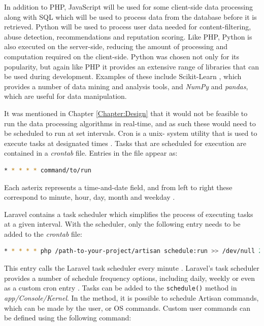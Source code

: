 In addition to PHP, JavaScript will be used for some client-side data processing along with SQL which will be used to process data from the database before it is retrieved. Python will be used to process user data needed for content-filtering, abuse detection, recommendations and reputation scoring. Like PHP, Python is also executed on the server-side, reducing the amount of processing and computation required on the client-side. Python was chosen not only for its popularity, but again like PHP it provides an extensive range of libraries that can be used during development. Examples of these include Scikit-Learn \cite{scikit:home}, which provides a number of data mining and analysis tools, and \emph{NumPy} and \emph{pandas}, which are useful for data manipulation.

It was mentioned in Chapter \ref{Chapter:Design} that it would not be feasible to run the data processing algorithms in real-time, and as such these would need to be scheduled to run at set intervals. Cron is a unix- system utility that is used to execute tasks at designated times \cite{Ubuntu:Cron}. Tasks that are scheduled for execution are contained in a \textit{crontab} file. Entries in the file appear as:
\begin{lstlisting}[language=bash]
* * * * * command/to/run
\end{lstlisting}

\noindent Each asterix represents a time-and-date field, and from left to right these correspond to minute, hour, day, month and weekday \cite{Ubuntu:Cron}. 

Laravel contains a task scheduler which simplifies the process of executing tasks at a given interval. With the scheduler, only the following entry needs to be added to the \textit{crontab} file:

\begin{lstlisting}[language=bash]
* * * * * php /path-to-your-project/artisan schedule:run >> /dev/null 2>&1
\end{lstlisting}

\noindent This entry calls the Laravel task scheduler every minute \cite{Laravel:Scheduling}. Laravel's task scheduler provides a number of schedule frequency options, including daily, weekly or even as a custom cron entry \cite{Laravel:Scheduling}. Tasks can be added to the \texttt{schedule()} method in \textit{app/Console/Kernel}. In the method, it is possible to schedule Artisan commands, which can be made by the user, or OS commands. Custom user commands can be defined using the following command:

